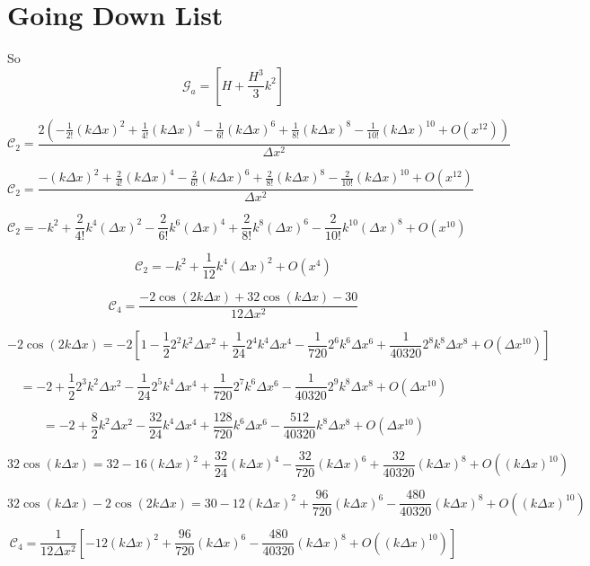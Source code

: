 \documentclass[12pt]{article}
\begin{document}
\section{Going Down List}

So 
\[\mathcal{G}_a =  \left[H + \frac{H^3}{3} k^2\right]\]

\[\mathcal{C}_2 = \frac{ 2\left(- \frac{1}{2!} (k\Delta x)^2 + \frac{1}{4!} (k\Delta x)^4 - \frac{1}{6!} (k\Delta x)^6 + \frac{1}{8!} (k\Delta x)^8 - \frac{1}{10!} (k\Delta x)^{10} + O(x^{12})\right) }{\Delta x^2}\]

\[\mathcal{C}_2 = \frac{- (k\Delta x)^2 + \frac{2}{4!} (k\Delta x)^4 - \frac{2}{6!} (k\Delta x)^6 + \frac{2}{8!} (k\Delta x)^8 - \frac{2}{10!} (k\Delta x)^{10} + O(x^{12}) }{\Delta x^2}\]

\[\mathcal{C}_2 = - k^2+ \frac{2}{4!} k^4(\Delta x)^2 - \frac{2}{6!} k^6(\Delta x)^4 + \frac{2}{8!} k^8(\Delta x)^6 - \frac{2}{10!} k^{10}(\Delta x)^{8} + O(x^{10}) \]

\[\mathcal{C}_2 = - k^2+ \frac{1}{12} k^4(\Delta x)^2 + O(x^{4}) \]

\[\mathcal{C}_4 = \frac{-2\cos\left(2k\Delta x\right) + 32\cos\left(k\Delta x\right)  - 30 }{12\Delta x^2}\]

\[-2\cos\left(2 k \Delta x\right) = -2\left[1 - \frac{1}{2} 2^2 k^2 \Delta x ^2 + \frac{1}{24} 2^4 k^4 \Delta x ^4 - \frac{1}{720} 2^6 k^6 \Delta x ^6 + \frac{1}{40320} 2^8 k^8 \Delta x^8 + O(\Delta x ^{10})\right]\]

\[= -2 + \frac{1}{2} 2^3 k^2 \Delta x ^2 - \frac{1}{24} 2^5 k^4 \Delta x ^4 + \frac{1}{720} 2^7 k^6 \Delta x ^6 - \frac{1}{40320} 2^9 k^8 \Delta x^8 + O(\Delta x ^{10})\]

\[= -2 + \frac{8}{2} k^2 \Delta x^2 - \frac{32}{24} k^4 \Delta x ^4 + \frac{128}{720} k^6 \Delta x ^6 - \frac{512}{40320} k^8 \Delta x^8 + O(\Delta x ^{10})\]

\[32\cos\left(k \Delta x\right) = 32 - 16 (k \Delta x)^2 + \frac{32}{24} (k \Delta x)^4 - \frac{32}{720} (k \Delta x)^6 + \frac{32}{40320} (k \Delta x)^8+ O((k \Delta x)^{10})\]

\[32\cos\left(k \Delta x\right) -2\cos\left(2 k \Delta x\right) = 30 - 12 (k \Delta x)^2  + \frac{96}{720} (k \Delta x)^6 - \frac{480}{40320} (k \Delta x)^8 + O((k \Delta x)^{10})     \]

\[\mathcal{C}_4 = \frac{1 }{12\Delta x^2} \left[- 12 (k \Delta x)^2  + \frac{96}{720} (k \Delta x)^6 - \frac{480}{40320} (k \Delta x)^8 + O((k \Delta x)^{10}) \right]\]
\end{document}
